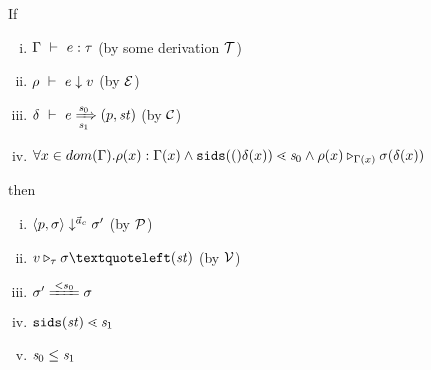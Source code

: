 \begin{thm}
	If 
	\begin{enumerate}[(i)]
		\item $\Type{\Gam}{e}{\tau}$ (by some derivation $\MT$)
		\item $\Eval{\rho}{e}{v}$ (by $\ME$) 
		\item $\Trans{\del}{e}{\s_0}{\s_1}{\sfun{p}{\st}}$ (by $\MC$)
		\item $\forall x \in dom(\Gam).\rho(x):\Gam(x) \wedge \sids(\del(x)) \SetLe \s_0  \wedge  \ValRep{\rho(x)}{\Gam(x)}{\sgm(\del(x))}$
	\end{enumerate}
	then 
	\begin{enumerate}[(i)]
		\item $\seval{p}{\sgm}{\a_c}{\sgm'}$ (by $\MP$)
		\item  $\ValRep{v}{\tau}{\sgm‘(\st)}$ (by $\MV$)
		\item $\sgm' \ConEq{s_0} \sgm $
		\item  $\sids{\st} \SetLe \s_1$
		\item $\s_0 \le \s_1$
	\end{enumerate} 
\end{thm}

